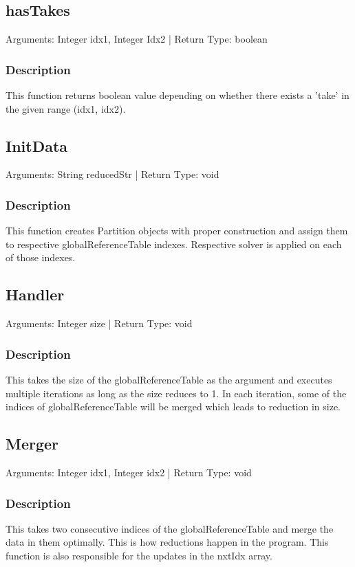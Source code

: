 \documentclass{article}
\begin{document}
\begin{flushleft}
\subsection{hasTakes}

Arguments: Integer idx1, Integer Idx2 | Return Type: boolean

\subsubsection*{Description}
This function returns boolean value depending on whether there exists a 'take' in the given range (idx1, idx2).


\subsection{InitData}

Arguments: String reducedStr | Return Type: void

\subsubsection*{Description}
This function creates Partition objects with proper construction and assign them to respective globalReferenceTable indexes. Respective solver is applied on each of those indexes.

\subsection{Handler}

Arguments: Integer size | Return Type: void

\subsubsection*{Description}
This takes the size of the globalReferenceTable as the argument and executes multiple iterations as long as the size reduces to 1. In each iteration, some of the indices of globalReferenceTable will be merged which leads to reduction in size.

\subsection{Merger}

Arguments: Integer idx1, Integer idx2 | Return Type: void

\subsubsection*{Description}
This takes two consecutive indices of the globalReferenceTable and merge the data in them optimally. This is how reductions happen in the program. This function is also responsible for the updates in the nxtIdx array.


\end{flushleft}
\end{document}
